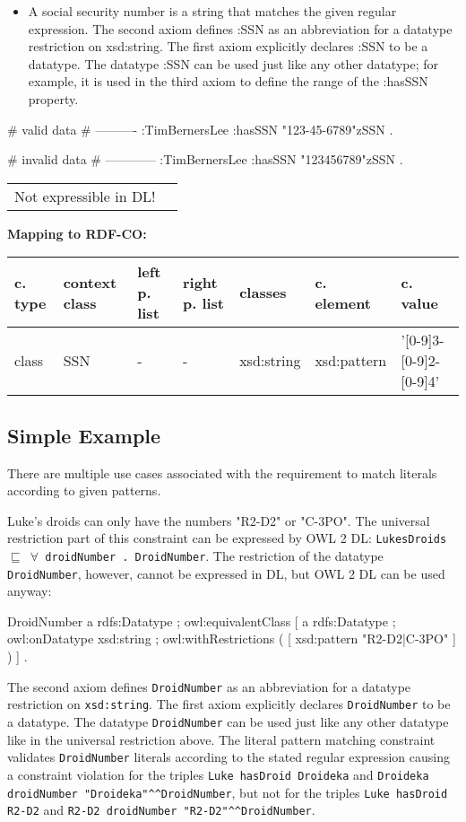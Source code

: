 \documentclass{llncs}
\newcommand{\ms}[1]{\texttt{#1}}
\newenvironment{gcotable}{
  \scriptsize
  \sffamily
  \vspace{0cm}
	\begin{center}
	\textbf{\vspace{0.4cm}Mapping to RDF-CO:} \\
  \begin{tabular}{l|l|l|l|l|l|l}
	\hline
  \textbf{c. type} & \textbf{context class} & \textbf{left p. list} & \textbf{right p. list} & \textbf{classes} & \textbf{c. element} & \textbf{c. value} \\
  \hline

}{
  \hline
  \end{tabular}
	\end{center}
}
\newenvironment{DL}{
  \vspace{0cm}
	\begin{center}
  \begin{tabular}{r l}

}{
  \end{tabular}
	\end{center}
}
\begin{document}
\begin{itemize}
	\item A social security number is a string that matches the given regular expression. 
The second axiom defines :SSN as an abbreviation for a datatype restriction on xsd:string. 
The first axiom explicitly declares :SSN to be a datatype. 
The datatype :SSN can be used just like any other datatype; 
for example, it is used in the third axiom to define the range of the :hasSSN property. 
\end{itemize}

\begin{ex}
# valid data
# ----------
:TimBernersLee
    :hasSSN "123-45-6789"^^:SSN .
\end{ex}

\begin{ex}
# invalid data
# ------------
:TimBernersLee
    :hasSSN "123456789"^^:SSN .
\end{ex}

\begin{DL}
Not expressible in DL!
\end{DL}

\begin{gcotable}
class & SSN & - & - & xsd:string & xsd:pattern & '[0-9]{3}-[0-9]{2}-[0-9]{4}' \\
\end{gcotable}

\subsection{Simple Example}

There are multiple use cases associated with the requirement to match literals according to given patterns.

Luke's droids can only have the numbers "R2-D2" or "C-3PO".
The universal restriction part of this constraint can be expressed by OWL 2 DL:
\ms{LukesDroids $\sqsubseteq$ $\forall$ droidNumber . DroidNumber}.
The restriction of the datatype \ms{DroidNumber}, however, cannot be expressed in DL, but OWL 2 DL can be used anyway:

\begin{ex}
DroidNumber 
    a rdfs:Datatype ;
    owl:equivalentClass [
        a rdfs:Datatype ;
        owl:onDatatype xsd:string ;
        owl:withRestrictions ( 
            [ xsd:pattern "R2-D2|C-3PO" ] ) ] .
\end{ex}

The second axiom defines \ms{DroidNumber} as an abbreviation for a datatype restriction on \ms{xsd:string}. 
The first axiom explicitly declares \ms{DroidNumber} to be a datatype. 
The datatype \ms{DroidNumber} can be used just like any other datatype like in the universal restriction above.
The literal pattern matching constraint validates \ms{DroidNumber} literals according to the stated regular expression causing a constraint violation for the triples 
\ms{Luke hasDroid Droideka} and \ms{Droideka droidNumber "Droideka"\textasciicircum{}\textasciicircum{}DroidNumber}, 
but not for the triples \ms{Luke hasDroid R2-D2} and \ms{R2-D2 droidNumber "R2-D2"\textasciicircum{}\textasciicircum{}DroidNumber}.
\end{document}
